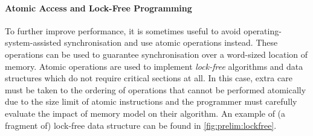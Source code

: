 \paragraph{Atomic Access and Lock-Free Programming}

To further improve performance, it is sometimes useful to avoid
operating-system-assisted synchronisation and use atomic operations instead.
These operations can be used to guarantee synchronisation over a word-sized
location of memory.
Atomic operations are used to implement \emph{lock-free} algorithms and data
structures which do not require critical sections at all.
In this case, extra care must be taken to the ordering of operations that cannot
be performed atomically due to the size limit of atomic instructions and the
programmer must carefully evaluate the impact of memory model on their
algorithm.
An example of (a fragment of) lock-free data structure can be found in \autoref{fig:prelim:lockfree}.

